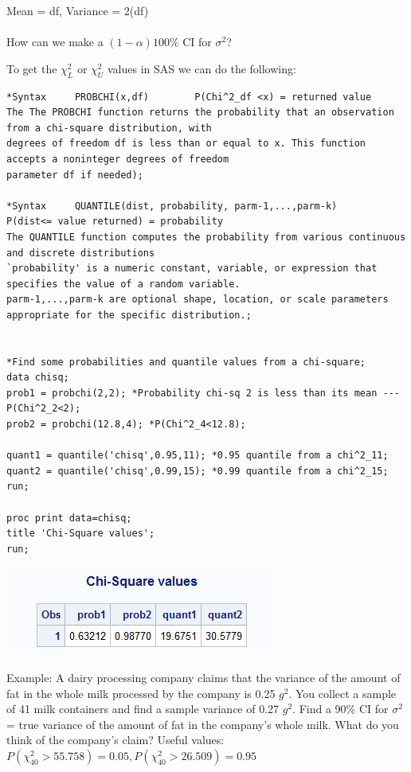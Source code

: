 Mean = df, Variance = 2(df)\\~\\
How can we make a $(1-\alpha)100\%$ CI for $\sigma^2$?

\newpage

To get the $\chi^2_L$ or $\chi^2_U$ values in SAS we can do the following:
\begin{small}
\begin{verbatim}
*Syntax     PROBCHI(x,df)        P(Chi^2_df <x) = returned value
The The PROBCHI function returns the probability that an observation from a chi-square distribution, with
degrees of freedom df is less than or equal to x. This function accepts a noninteger degrees of freedom 
parameter df if needed);

*Syntax     QUANTILE(dist, probability, parm-1,...,parm-k)       P(dist<= value returned) = probability 
The QUANTILE function computes the probability from various continuous and discrete distributions
`probability' is a numeric constant, variable, or expression that specifies the value of a random variable.
parm-1,...,parm-k are optional shape, location, or scale parameters appropriate for the specific distribution.;


*Find some probabilities and quantile values from a chi-square;
data chisq;
prob1 = probchi(2,2); *Probability chi-sq 2 is less than its mean --- P(Chi^2_2<2);
prob2 = probchi(12.8,4); *P(Chi^2_4<12.8);

quant1 = quantile('chisq',0.95,11); *0.95 quantile from a chi^2_11;
quant2 = quantile('chisq',0.99,15); *0.99 quantile from a chi^2_15;
run;

proc print data=chisq;
title 'Chi-Square values';
run;
\end{verbatim}
\end{small}

\begin{center}
\includegraphics[scale=0.8]{chivalues}
\end{center}

Example:  A dairy processing company claims that the variance of the amount of fat in the whole milk processed by the company is 0.25 $g^2$.  You collect a sample of 41 milk containers and find a sample variance of 0.27 $g^2$.  Find a 90\% CI for $\sigma^2$ = true variance of the amount of fat in the company's whole milk.  What do you think of the company's claim?  Useful values: $P(\chi^2_{40}>55.758)=0.05, P(\chi^2_{40}>26.509)=0.95$ 

